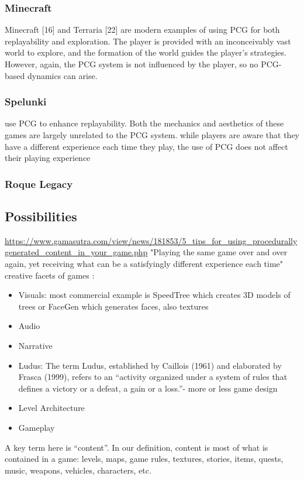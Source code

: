 \documentclass[MGS,Master,english]{twbook}%
\begin{document}
\subsubsection{Minecraft}
Minecraft [16] and Terraria [22] are modern examples of using PCG for both replayability and exploration. The player is provided with an inconceivably vast world to explore, and the formation of the world guides the player’s strategies. However, again, the PCG system is not influenced by the player, so no PCG-based dynamics can arise.\cite{pcg::endlessWeb}
\subsubsection{Spelunki}
use PCG to enhance replayability. Both the mechanics and aesthetics of these games are largely unrelated to the PCG system. while players are aware that they have a different experience each time they play, the use of PCG does not affect their playing experience
\subsubsection{Roque Legacy}
\subsection{Possibilities}
\url{https://www.gamasutra.com/view/news/181853/5_tips_for_using_procedurallygenerated_content_in_your_game.php}
"Playing the same game over and over again, yet receiving what can be a satisfyingly different experience each time"\\

creative facets of games \cite{pcg::computationalGameCreativity}:
\begin{itemize}
	\item Visuals: most commercial example is SpeedTree which creates 3D models of trees or FaceGen which generates faces, also textures
	\item Audio
	\item Narrative
	\item  Ludus: The term Ludus, established by Caillois (1961) and elaborated	by Frasca (1999), refers to an “activity organized under a	system of rules that defines a victory or a defeat, a gain or a loss.”- more or less game design
	\item Level Architecture
	\item Gameplay
\end{itemize}

A key term here is “content”. In our definition, content is most of what is contained in a game: levels, maps, game rules, textures, stories, items, quests, music, weapons, vehicles, characters, etc. \cite{pcg::book}
\end{document}
